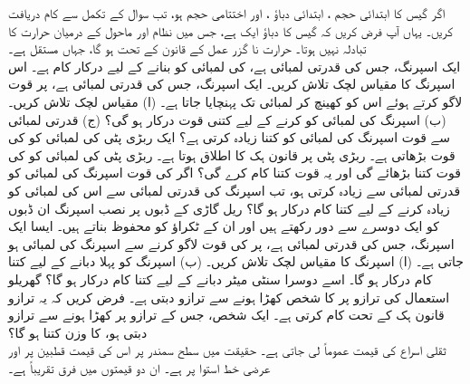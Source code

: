 اگر گیس کا ابتدائی حجم ، ابتدائی دباؤ ، اور اختتامی حجم  ہو، تب سوال  کے تکمل سے کام دریافت کریں۔ یہاں آپ فرض کریں کہ گیس کا دباؤ ایک  ہے، جس میں نظام اور ماحول کے درمیان حرارت کا تبادلہ نہیں ہوتا۔ حرارت نا گزر عمل کے قانون کے تحت  ہو گا، جہاں  مستقل ہے۔ 
\\
ایک اسپرنگ، جس کی قدرتی لمبائی  ہے، کی لمبائی کو  بنانے کے لیے درکار کام  ہے۔ اس اسپرنگ کا مقیاس لچک تلاش کریں۔
ایک اسپرنگ، جس کی قدرتی لمبائی  ہے، پر  قوت لاگو کرتے ہوئے اس  کو کھینچ کر  لمبائی تک پہنچایا جاتا ہے۔ (ا) مقیاس لچک تلاش کریں۔ (ب) اسپرنگ کی لمبائی کو  کرنے کے لیے کتنی قوت درکار ہو گی؟ (ج) قدرتی لمبائی سے  قوت اسپرنگ کی لمبائی کو کتنا زیادہ کرتی ہے؟
ایک ربڑی پٹی کی لمبائی کو  کی قوت  بڑھاتی ہے۔ ربڑی پٹی پر قانون ہک کا اطلاق ہوتا ہے۔ ربڑی پٹی کی لمبائی کو  کی قوت کتنا بڑھائے گی اور یہ قوت کتنا کام کرے گی؟
اگر  کی قوت اسپرنگ کی لمبائی کو قدرتی لمبائی سے  زیادہ کرتی ہو، تب اسپرنگ کی قدرتی لمبائی سے اس کی لمبائی کو  زیادہ کرنے کے لیے کتنا کام درکار ہو گا؟
ریل گاڑی کے ڈبوں پر نصب اسپرنگ ان ڈبوں کو ایک دوسرے سے دور رکھتے ہیں اور ان کے  ٹکراؤ کو محفوظ بناتے ہیں۔ ایسا ایک اسپرنگ، جس کی قدرتی لمبائی  ہے، پر  کی قوت  لاگو کرنے سے اسپرنگ کی لمبائی   ہو جاتی ہے۔ (ا) اسپرنگ کا مقیاس لچک تلاش کریں۔ (ب) اسپرنگ کو پہلا  دبانے کے لیے کتنا کام درکار ہو گا۔ اسے  دوسرا سنٹی میٹر دبانے کے لیے کتنا کام درکار ہو گا؟
گھریلو استعمال کی ترازو پر  کا شخص کھڑا ہونے سے ترازو   دبتی ہے۔ فرض کریں کہ یہ ترازو قانون ہک کے تحت کام کرتی ہے۔ ایک شخص، جس کے  ترازو پر کھڑا ہونے سے ترازو  دبتی  ہو، کا وزن کتنا ہو گا؟
\\
ثقلی اسراع کی قیمت عموماً  لی جاتی ہے۔ حقیقت میں سطح سمندر پر اس کی قیمت قطبین پر  اور  عرضی خط استوا پر  ہے۔ ان دو قیمتوں میں فرق تقریباً  ہے۔

